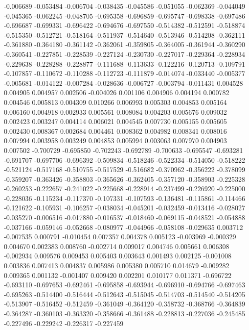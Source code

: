 -0.006689
-0.053484
-0.006704
-0.038435
-0.045586
-0.051055
-0.062369
-0.044049
-0.045365
-0.062245
-0.048705
-0.695358
-0.696859
-0.695747
-0.698338
-0.697486
-0.696687
-0.699331
-0.696422
-0.694676
-0.697550
-0.514382
-0.512591
-0.518874
-0.515350
-0.512721
-0.518164
-0.511937
-0.514640
-0.513946
-0.514208
-0.362111
-0.361880
-0.364180
-0.361142
-0.362061
-0.359805
-0.364005
-0.361944
-0.360290
-0.360541
-0.227851
-0.228539
-0.227124
-0.230730
-0.227017
-0.229364
-0.228934
-0.229638
-0.228288
-0.228877
-0.111688
-0.113633
-0.122216
-0.120713
-0.109791
-0.107857
-0.110672
-0.110288
-0.112723
-0.111879
-0.014074
-0.033440
-0.005377
-0.005681
-0.014122
-0.007284
-0.028636
-0.006727
-0.003794
-0.011431
0.004528
0.004905
0.004957
0.002506
-0.004026
0.001106
0.004906
0.004194
0.000782
0.004546
0.005813
0.004309
0.010266
0.006993
0.005303
0.004853
0.005164
0.006160
0.004918
0.002933
0.005561
0.008084
0.004203
0.005676
0.009032
0.002423
0.003247
0.004114
0.006021
0.004545
0.007730
0.005155
0.005605
0.002430
0.008367
0.002684
0.004461
0.008362
0.004982
0.008341
0.008016
0.007994
0.003958
0.003249
0.004853
0.005994
0.003063
0.007970
0.004903
0.007502
-0.700729
-0.695850
-0.702243
-0.692789
-0.700633
-0.695547
-0.693281
-0.691707
-0.697706
-0.696392
-0.509834
-0.518246
-0.522334
-0.514050
-0.518222
-0.521124
-0.517168
-0.510755
-0.517529
-0.516682
-0.370962
-0.356222
-0.378099
-0.359207
-0.363426
-0.358803
-0.365626
-0.362405
-0.357120
-0.358903
-0.225328
-0.260253
-0.222657
-0.241022
-0.225668
-0.228914
-0.237499
-0.226920
-0.225000
-0.228036
-0.115234
-0.117370
-0.107331
-0.107593
-0.136481
-0.115861
-0.114466
-0.121622
-0.105931
-0.106257
-0.038034
-0.045201
-0.032459
-0.013416
-0.028027
-0.035270
-0.006516
-0.017880
-0.016537
-0.018460
-0.069115
-0.048521
-0.054888
-0.037166
-0.059146
-0.052668
-0.080977
-0.044966
-0.058108
-0.029635
0.003712
-0.007535
0.000791
-0.010454
0.007357
0.004378
0.005123
-0.003969
-0.000329
0.004670
0.002383
0.008760
-0.002714
0.009017
0.004746
0.005661
0.006308
-0.002934
0.009576
0.009453
0.005403
0.003643
0.001493
0.002125
-0.001008
0.003836
0.007413
0.004837
0.005986
0.005380
0.005710
0.014679
-0.009282
0.009365
0.001132
-0.001407
0.009420
0.002201
0.010177
0.011371
-0.696722
-0.693110
-0.697653
-0.692461
-0.695858
-0.693944
-0.696910
-0.694766
-0.697463
-0.695263
-0.514400
-0.516444
-0.512643
-0.515045
-0.514703
-0.514540
-0.514205
-0.513907
-0.516452
-0.512459
-0.361049
-0.364120
-0.358732
-0.368766
-0.364839
-0.364287
-0.360103
-0.363320
-0.358666
-0.361488
-0.228813
-0.227036
-0.245485
-0.227496
-0.229242
-0.226317
-0.227459
